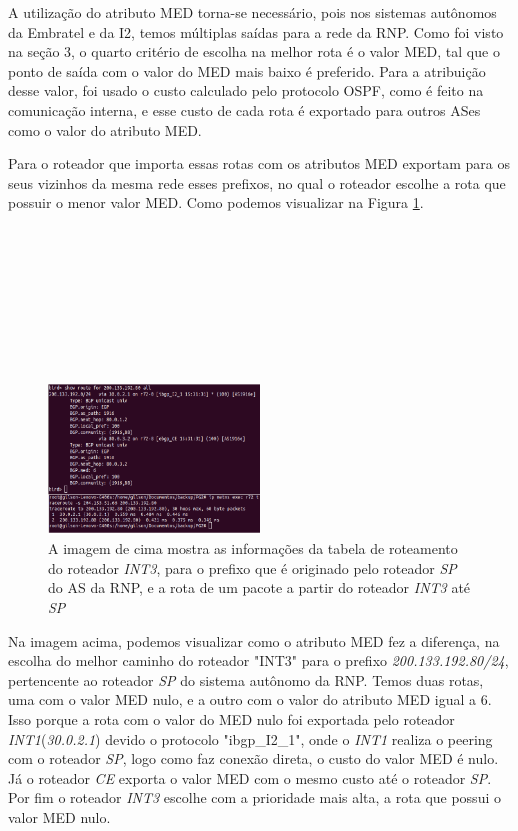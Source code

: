 \documentclass[12pt,a4paper]{report}
\begin{document}
A utiliza\c{c}\~ao do atributo MED torna-se necess\'ario, pois nos sistemas aut\^onomos da Embratel e da I2, temos m\'ultiplas sa\'idas para a rede da RNP. Como foi visto na se\c{c}\~ao 3, o quarto crit\'erio de escolha na melhor rota \'e o valor MED, tal que o ponto de sa\'ida com o valor do MED mais baixo \'e preferido. Para a atribui\c{c}\~ao desse valor, foi usado o custo calculado pelo protocolo OSPF, como \'e feito na comunica\c{c}\~ao interna, e esse custo de cada rota \'e exportado para outros ASes como o valor do atributo MED.

Para o roteador que importa essas rotas com os atributos MED exportam para os seus vizinhos da mesma rede esses prefixos, no qual o roteador escolhe a rota que possuir o menor valor MED. Como podemos visualizar na Figura \ref{fig:imagem10}.
\\
\\
\\
\\
\\
\\
\\
\\
\\
\begin{figure}[!htb]
 \centering
 \includegraphics[width=0.5\textwidth]{Imagens/figura63}
  \caption{\label{fig:imagem10} A imagem de cima mostra as informa\c{c}\~oes da tabela de roteamento do roteador \textit{INT3}, para o prefixo que \'e originado pelo roteador \textit{SP} do AS da RNP, e a rota de um pacote a partir do roteador \textit{INT3} at\'e \textit{SP}}
\end{figure}

Na imagem acima, podemos visualizar como o atributo MED fez a diferen\c{c}a, na escolha do melhor caminho do roteador "INT3" para o prefixo \textit{200.133.192.80/24}, pertencente ao roteador \textit{SP} do sistema aut\^onomo da RNP. Temos duas rotas, uma com o valor MED nulo, e a outro com o valor do atributo MED igual a 6. Isso porque a rota com o valor do MED nulo foi exportada pelo roteador \textit{INT1}(\textit{30.0.2.1}) devido o protocolo "ibgp\_I2\_1", onde o \textit{INT1} realiza o peering com o roteador \textit{SP}, logo como faz conex\~ao direta, o custo do valor MED \'e nulo. J\'a o roteador \textit{CE} exporta o valor MED com o mesmo custo at\'e o roteador \textit{SP}. Por fim o roteador \textit{INT3} escolhe com a prioridade mais alta, a rota que possui o valor MED nulo.
\end{document}
